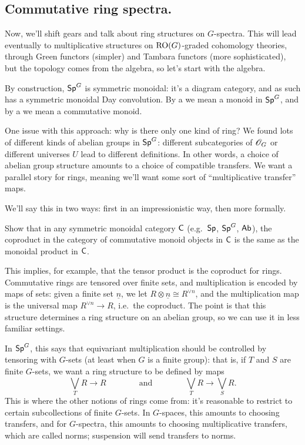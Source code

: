 \subsection*{Commutative ring spectra.}
Now, we'll shift gears and talk about ring structures on $G$-spectra. This will lead eventually to multiplicative
structures on $\mathrm{RO}(G)$-graded cohomology theories, through Green functors (simpler) and Tambara functors (more
sophisticated), but the topology comes from the algebra, so let's start with the algebra.

By construction, $\mathsf{Sp}^G$ is symmetric monoidal: it's a diagram category, and as such has a symmetric monoidal Day
convolution. By a  we mean a monoid in $\mathsf{Sp}^G$, and by a  we
mean a commutative monoid.

One issue with this approach: why is there only one kind of ring? We found lots of different kinds of abelian
groups in $\mathsf{Sp}^G$: different subcategories of $\mathscr O_G$ or different universes $U$ lead to different definitions. In
other words, a choice of abelian group structure amounts to a choice of compatible transfers. We want a parallel
story for rings, meaning we'll want some sort of ``multiplicative transfer'' maps.

We'll say this in two ways: first in an impressionistic way, then more formally.

\begin{ex}
Show that in any symmetric monoidal category $\mathsf C$ (e.g.\ $\mathsf{Sp}$, $\mathsf{Sp}^G$, $\mathsf{Ab}$), the coproduct in the category
of commutative monoid objects in $\mathsf C$ is the same as the monoidal product in $\mathsf C$.
\end{ex}
This implies, for example, that the tensor product is the coproduct for rings.
Commutative rings are tensored over finite sets, and multiplication is encoded by maps of sets: given a finite set
$\underline n$, we let $R\otimes\underline n\cong R^{\lor n}$, and the multiplication map is the universal map
$R^{\vee n}\to R$, i.e.\ the coproduct. The point is that this structure determines a ring structure on an abelian
group, so we can use it in less familiar settings.

In $\mathsf{Sp}^G$, this says that equivariant multiplication should be controlled by tensoring with $G$-sets (at least
when $G$ is a finite group): that is, if $T$ and $S$ are finite $G$-sets, we want a ring structure to be defined by
maps
\[\bigvee_T R\longrightarrow R\qquad\qquad\text{and}\qquad\qquad\bigvee_T
R\longrightarrow\bigvee_S R.\]
This is where the other notions of rings come from: it's reasonable to restrict to certain subcollections of finite
$G$-sets. In $G$-spaces, this amounts to choosing transfers, and for $G$-spectra, this amounts to choosing
multiplicative transfers, which are called norms; suspension will send transfers to norms.

